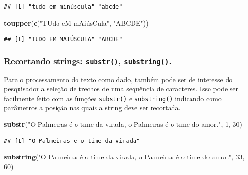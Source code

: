 \documentclass[]{book}
\newenvironment{Shaded}{\begin{snugshade}}{\end{snugshade}}
\newcommand{\DecValTok}[1]{\textcolor[rgb]{0.00,0.00,0.81}{#1}}
\newcommand{\KeywordTok}[1]{\textcolor[rgb]{0.13,0.29,0.53}{\textbf{#1}}}
\newcommand{\NormalTok}[1]{#1}
\newcommand{\StringTok}[1]{\textcolor[rgb]{0.31,0.60,0.02}{#1}}
\begin{document}
\begin{verbatim}
## [1] "tudo em minúscula" "abcde"
\end{verbatim}

\begin{Shaded}
\begin{Highlighting}[]
\KeywordTok{toupper}\NormalTok{(}\KeywordTok{c}\NormalTok{(}\StringTok{"TUdo eM mAiúsCula", "}\NormalTok{ABCDE}\StringTok{"))}
\end{Highlighting}
\end{Shaded}

\begin{verbatim}
## [1] "TUDO EM MAIÚSCULA" "ABCDE"
\end{verbatim}

\hypertarget{recortando-strings-substr-substring.}{%
\subsubsection{\texorpdfstring{Recortando strings: \texttt{substr()}, \texttt{substring()}.}{Recortando strings: substr(), substring().}}\label{recortando-strings-substr-substring.}}

Para o processamento do texto como dado, também pode ser de interesse do pesquisador a seleção de trechos de uma sequência de caracteres. Isso pode ser facilmente feito com as funções \texttt{substr()} e \texttt{substring()} indicando como parâmetros a posição nas quais a string deve ser recortada.

\begin{Shaded}
\begin{Highlighting}[]
\KeywordTok{substr}\NormalTok{(}\StringTok{"O Palmeiras é o time da virada, o Palmeiras é o time do amor."}\NormalTok{, }\DecValTok{1}\NormalTok{, }\DecValTok{30}\NormalTok{)}
\end{Highlighting}
\end{Shaded}

\begin{verbatim}
## [1] "O Palmeiras é o time da virada"
\end{verbatim}

\begin{Shaded}
\begin{Highlighting}[]
\KeywordTok{substring}\NormalTok{(}\StringTok{"O Palmeiras é o time da virada, o Palmeiras é o time do amor."}\NormalTok{, }\DecValTok{33}\NormalTok{, }\DecValTok{60}\NormalTok{)}
\end{Highlighting}
\end{Shaded}
\end{document}
